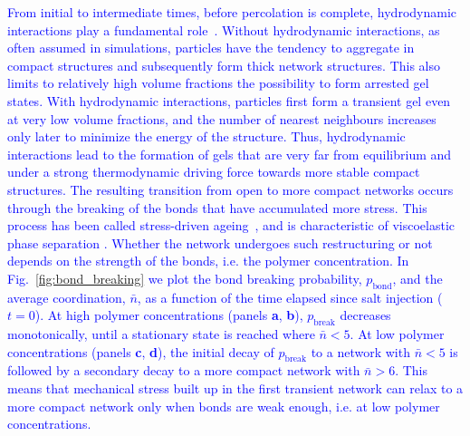 \documentclass[preprint,amsmath,amssymb,superscriptaddress]{revtex4-1}
\begin{document}
\textcolor{blue}
{
From initial to intermediate times, before percolation is complete, hydrodynamic interactions play a fundamental role~\cite{tanaka2000,tanaka2007spontaneous,furukawa2010key}.
Without hydrodynamic interactions, as often assumed in simulations, particles have the tendency to aggregate in compact structures and subsequently form thick network structures. This also limits to relatively high volume fractions the possibility to form arrested gel states. 
With hydrodynamic interactions, particles first form a transient gel even at very low volume fractions, and the number of nearest neighbours increases only later to minimize the energy of the structure. Thus, hydrodynamic interactions lead to the formation of gels that are very far from equilibrium and under a strong thermodynamic driving force towards more stable compact structures. The resulting transition from open to more compact networks occurs through the breaking of the bonds that have accumulated more stress. This process has been called stress-driven ageing~\cite{tanaka2007spontaneous}, and is characteristic of viscoelastic phase separation \cite{tanaka2000viscoelastic}. Whether the network undergoes such restructuring or not depends on the strength of the bonds, i.e. the polymer concentration.
In Fig.~\ref{fig:bond_breaking} we plot the bond breaking probability, $p_\text{bond}$, and the average coordination, $\bar{n}$, as a function of the time elapsed since salt injection ($t=0$).
At high polymer concentrations (panels \textbf{a}, \textbf{b}), $p_\text{break}$ decreases monotonically, until a stationary state is reached where $\bar{n}<5$.
At low polymer concentrations (panels \textbf{c}, \textbf{d}), the initial decay of $p_\text{break}$ to a network with $\bar{n}<5$ is followed by a secondary decay to a more compact network with $\bar{n}>6$. This means that mechanical stress built up in the first transient network can relax to a more compact network only when bonds are weak enough, i.e. at low polymer concentrations.
}
\end{document}
